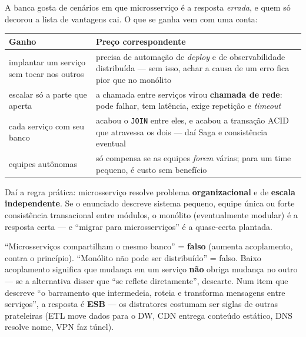 \begin{conceito}
A banca gosta de cenários em que microsserviço é a resposta \emph{errada}, e
quem só decorou a lista de vantagens cai. O que se ganha vem com uma conta:

\begin{center}
\begin{tabular}{@{}p{5.4cm}p{7cm}@{}}
\toprule
\textbf{Ganho} & \textbf{Preço correspondente} \\
\midrule
implantar um serviço sem tocar nos outros & precisa de automação de
\emph{deploy} e de observabilidade distribuída --- sem isso, achar a causa de
um erro fica pior que no monólito \\
escalar só a parte que aperta & a chamada entre serviços virou \textbf{chamada
de rede}: pode falhar, tem latência, exige repetição e \emph{timeout} \\
cada serviço com seu banco & acabou o \texttt{JOIN} entre eles, e acabou a
transação ACID que atravessa os dois --- daí Saga e consistência eventual \\
equipes autônomas & só compensa se as equipes \emph{forem} várias; para um
time pequeno, é custo sem benefício \\
\bottomrule
\end{tabular}
\end{center}

Daí a regra prática: microsserviço resolve problema \textbf{organizacional} e
de \textbf{escala independente}. Se o enunciado descreve sistema pequeno,
equipe única ou forte consistência transacional entre módulos, o monólito
(eventualmente modular) é a resposta certa --- e ``migrar para microsserviços''
é a quase-certa plantada.
\end{conceito}

\begin{pegadinha}
``Microsserviços compartilham o mesmo banco'' = \textbf{falso} (aumenta
acoplamento, contra o princípio). ``Monólito não pode ser distribuído'' =
falso. Baixo acoplamento significa que mudança em um serviço \textbf{não}
obriga mudança no outro --- se a alternativa disser que ``se reflete
diretamente'', descarte. Num item que descreve ``o barramento que intermedeia,
roteia e transforma mensagens entre serviços'', a resposta é \textbf{ESB} ---
os distratores costumam ser siglas de outras prateleiras (ETL move dados para
o DW, CDN entrega conteúdo estático, DNS resolve nome, VPN faz túnel).
\end{pegadinha}


